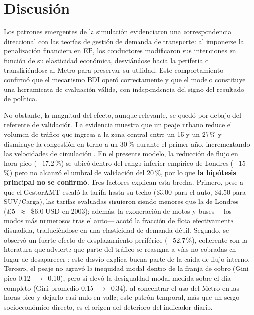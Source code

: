 \documentclass[twocolumn,10pt]{article}
\begin{document}
\section{Discusi\'on}
Los patrones emergentes de la simulaci\'on evidenciaron una correspondencia direccional
con las teor\'ias de gesti\'on de demanda de transporte: al imponerse la penalizaci\'on
financiera en EB, los conductores modificaron sus intenciones en funci\'on de su
elasticidad econ\'omica, desvi\'andose hacia la periferia o transfiri\'endose al Metro para
preservar su utilidad. Este comportamiento confirm\'o que el mecanismo BDI oper\'o
correctamente y que el modelo constituye una herramienta de evaluaci\'on v\'alida, con
independencia del signo del resultado de pol\'itica.

No obstante, la magnitud del efecto, aunque relevante, se qued\'o por debajo del referente
de validaci\'on. La evidencia muestra que un peaje urbano reduce el volumen de tr\'afico
que ingresa a la zona central entre un 15 y un 27\,\% y disminuye la congesti\'on en torno
a un 30\,\% durante el primer a\~no, incrementando las velocidades de circulaci\'on
\cite{london2020,london2024,atmos2012}. En el presente modelo, la reducci\'on de flujo en
hora pico ($-17.2$\,\%) se ubic\'o dentro del rango inferior emp\'irico de Londres
($-15$\,\%) pero no alcanz\'o el umbral de validaci\'on del 20\,\%, por lo que \textbf{la
hip\'otesis principal no se confirm\'o}. Tres factores explican esta brecha. Primero, pese
a que el GestorAMT escal\'o la tarifa hasta su techo (\$3.00 para el auto, \$4.50 para
SUV/Carga), las tarifas evaluadas siguieron siendo menores que la de Londres
(\pounds5~$\approx$~\$6.0 USD en 2003); adem\'as, la exoneraci\'on de motos y buses ---los
modos m\'as numerosos tras el auto--- acot\'o la fracci\'on de flota efectivamente
disuadida, traduci\'endose en una elasticidad de demanda d\'ebil. Segundo, se observ\'o un
fuerte efecto de desplazamiento perif\'erico ($+52.7$\,\%), coherente con la literatura que
advierte que parte del tr\'afico se reasigna a v\'ias no cobradas en lugar de desaparecer
\cite{london2024}; este desv\'io explica buena parte de la ca\'ida de flujo interno.
Tercero, el peaje no agrav\'o la inequidad modal dentro de la franja de cobro (Gini pico
0.12~$\rightarrow$~0.10), pero s\'i elev\'o la desigualdad modal medida sobre el d\'ia
completo (Gini promedio 0.15~$\rightarrow$~0.34), al concentrar el uso del Metro en las
horas pico y dejarlo casi nulo en valle; este patr\'on temporal, m\'as que un sesgo
socioecon\'omico directo, es el origen del deterioro del indicador diario.
\end{document}
